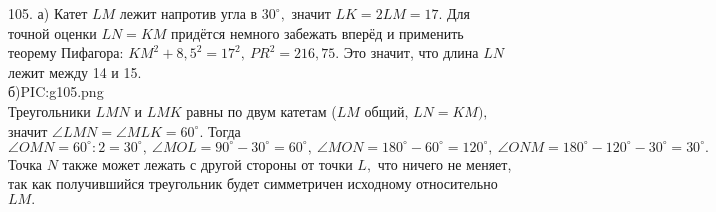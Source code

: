 105. а) Катет $LM$ лежит напротив угла в $30^\circ,$ значит $LK=2LM=17.$ Для точной оценки $LN=KM$ придётся немного забежать вперёд и применить теорему Пифагора: $KM^2+8,5^2=17^2,\ PR^2=216,75.$ Это значит, что длина $LN$ лежит между 14 и 15.\\
б){{PIC:g105.png}}\\
Треугольники $LMN$ и $LMK$ равны по двум катетам ($LM$ общий, $LN=KM),$ значит $\angle LMN=\angle MLK=60^\circ.$ Тогда $\angle OMN=60^\circ:2=30^\circ,\ \angle MOL=90^\circ-30^\circ=60^\circ,\ \angle MON=180^\circ-60^\circ=120^\circ,\ \angle ONM=180^\circ-120^\circ-30^\circ=30^\circ.$ Точка $N$ также может лежать с другой стороны от точки $L,$ что ничего не меняет, так как получившийся треугольник будет симметричен исходному относительно $LM.$\\
